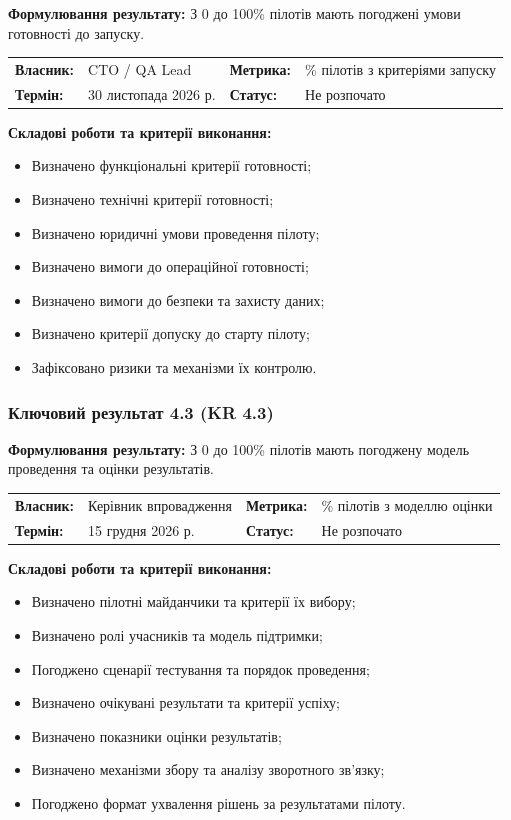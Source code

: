 \documentclass{article}
\begin{document}
\textbf{Формулювання результату:} З 0 до 100\% пілотів мають погоджені умови готовності до запуску.

\noindent\begin{tabular}{@{}p{2.2cm}p{4.5cm}p{2.2cm}p{4.5cm}@{}}
\toprule
\textbf{Власник:} & CTO / QA Lead & \textbf{Метрика:} & \% пілотів з критеріями запуску \\
\textbf{Термін:} & 30 листопада 2026 р. & \textbf{Статус:} & Не розпочато \\
\bottomrule
\end{tabular}

\vspace{10pt}
\textbf{Складові роботи та критерії виконання:}
\begin{itemize}
    \item Визначено функціональні критерії готовності;
    \item Визначено технічні критерії готовності;
    \item Визначено юридичні умови проведення пілоту;
    \item Визначено вимоги до операційної готовності;
    \item Визначено вимоги до безпеки та захисту даних;
    \item Визначено критерії допуску до старту пілоту;
    \item Зафіксовано ризики та механізми їх контролю.
\end{itemize}

\subsubsection{Ключовий результат 4.3 (KR 4.3)}

\textbf{Формулювання результату:} З 0 до 100\% пілотів мають погоджену модель проведення та оцінки результатів.

\noindent\begin{tabular}{@{}p{2.2cm}p{4.5cm}p{2.2cm}p{4.5cm}@{}}
\toprule
\textbf{Власник:} & Керівник впровадження & \textbf{Метрика:} & \% пілотів з моделлю оцінки \\
\textbf{Термін:} & 15 грудня 2026 р. & \textbf{Статус:} & Не розпочато \\
\bottomrule
\end{tabular}

\vspace{10pt}
\textbf{Складові роботи та критерії виконання:}
\begin{itemize}
    \item Визначено пілотні майданчики та критерії їх вибору;
    \item Визначено ролі учасників та модель підтримки;
    \item Погоджено сценарії тестування та порядок проведення;
    \item Визначено очікувані результати та критерії успіху;
    \item Визначено показники оцінки результатів;
    \item Визначено механізми збору та аналізу зворотного зв’язку;
    \item Погоджено формат ухвалення рішень за результатами пілоту.
\end{itemize}
\end{document}

